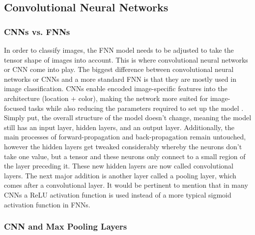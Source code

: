 \documentclass[12pt]{article}
\begin{document}
          

        \subsection{Convolutional Neural Networks}

           \subsubsection{CNNs vs. FNNs}

            
                In order to classify images, the FNN model needs to be adjusted to take the tensor shape of images into account. 
                This is where convolutional neural networks or CNN come into play. 
                The biggest difference between convolutional neural networks 
                or CNNs and a more standard FNN is that they are mostly used in image classification. 
                CNNs enable encoded image-specific features into the architecture (location + color), 
                making the network more suited for image-focused tasks 
                while also reducing the parameters required to set up the model \cite{oshea2015}. 
                Simply put, the overall structure of the model doesn’t change, 
                meaning the model still has an input layer, hidden layers, and an output layer. 
                Additionally, the main processes of forward-propagation and back-propagation remain untouched, 
                however the hidden layers get tweaked considerably whereby the neurons don’t take one value, 
                but a tensor and these neurons only connect to a small region of the layer preceding it. 
                These new hidden layers are now called convolutional layers. 
                The next major addition is another layer called a pooling layer, which comes after a convolutional layer. 
                It would be pertinent to mention that in many CNNs a ReLU activation function is used 
                instead of a more typical sigmoid activation function in FNNs.
            
            \subsubsection{CNN and Max Pooling Layers}
\end{document}
